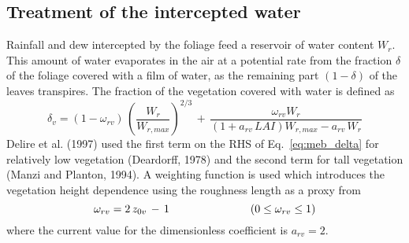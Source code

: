 \subsection{Treatment of the intercepted water}

Rainfall and dew intercepted by the foliage feed a
reservoir of water content $W_r$.  This amount of water
evaporates in the air at a potential rate from the fraction
$\delta$ of the foliage covered with a film of water, as the
remaining part $(1-\delta)$ of the leaves transpires.
%
The fraction of the vegetation covered with water is defined as
%
\begin{equation}
\label{eq:meb_delta}
\delta_v = 
\left(1-\omega_{rv}\right)\,\left( \frac{W_{r}}{W_{r,max}} \right)^{2/3}
\,+\, {\frac{\omega_{rv} W_{r}}
{\left(1+a_{rv}\,LAI\right)W_{r,max} - a_{rv}\,W_{r} }}
%
\end{equation}
%
Delire et al. (1997)\nocite{Delire1997} 
used
the first term on the RHS of Eq.~\ref{eq:meb_delta} for
relatively low
vegetation 
(Deardorff, 1978)\nocite{Deardorff1978} and
the second term 
for tall vegetation 
(Manzi and Planton, 1994)\nocite{manzi_planton_94}.
%
A weighting function is used which introduces the
vegetation height dependence using the roughness length as a proxy
from
%
\begin{equation}
\label{eq:meb_delta_wght}
\omega_{rv} = 2 \,z_{0v} \,-\, 1
\hskip1.in
\left(0 \leq \omega_{rv} \leq 1 \right)
\end{equation}
%
where the current value for the dimensionless 
coefficient is $a_{rv}=2$. 


